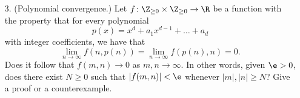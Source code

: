 \documentclass[11pt]{article}
\begin{document}
\begin{enumerate}
  \item[3.]
    (Polynomial convergence.)
    Let $f\colon\Z_{\ge0}\times\Z_{\ge0}\to\R$ be a function with the property that for every polynomial
    \[
      p(x)=x^d+a_1x^{d-1}+\dots+a_d
     \]
     with integer coefficients, we have that
     \[
       \lim_{n\to\infty}f(n,p(n))=\lim_{n\to\infty}f(p(n),n)=0.
     \]
     Does it follow that $f(m,n)\to 0$ as $m,n\to\infty$. In other words, given $\e>0$, does there exist $N\ge 0$ such that $|f(m,n)|<\e$ whenever $|m|,|n|\ge N$? Give a proof or a counterexample. 
    
  \end{enumerate}
\end{document}
